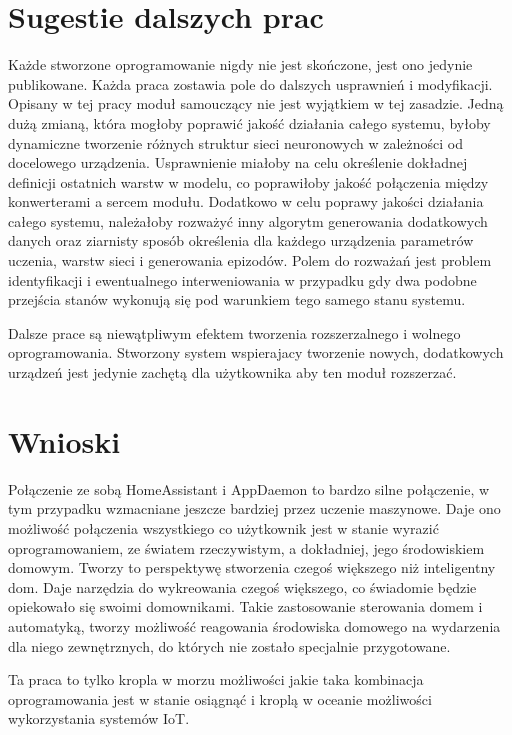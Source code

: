 \section*{Sugestie dalszych prac}
Każde stworzone oprogramowanie nigdy nie jest skończone, jest ono jedynie publikowane. Każda praca zostawia pole do dalszych usprawnień i modyfikacji. Opisany w tej pracy moduł samouczący nie jest wyjątkiem w tej zasadzie. Jedną dużą zmianą, która mogłoby poprawić jakość działania całego systemu, byłoby dynamiczne tworzenie różnych struktur sieci neuronowych w zależności od docelowego urządzenia. Usprawnienie miałoby na celu określenie dokładnej definicji ostatnich warstw w modelu, co poprawiłoby jakość połączenia między konwerterami a sercem modułu. Dodatkowo w celu poprawy jakości działania całego systemu, należałoby rozważyć inny algorytm generowania dodatkowych danych oraz ziarnisty sposób określenia dla każdego urządzenia parametrów uczenia, warstw sieci i generowania epizodów. Polem do rozważań jest problem identyfikacji i ewentualnego interweniowania w przypadku gdy dwa podobne przejścia stanów wykonują się pod warunkiem tego samego stanu systemu. 

Dalsze prace są niewątpliwym efektem tworzenia rozszerzalnego i wolnego oprogramowania. Stworzony system wspierajacy tworzenie nowych, dodatkowych urządzeń jest jedynie zachętą dla użytkownika aby ten moduł rozszerzać.

\section*{Wnioski}
Połączenie ze sobą HomeAssistant i AppDaemon to bardzo silne połączenie, w tym przypadku wzmacniane jeszcze bardziej przez uczenie maszynowe. Daje ono możliwość połączenia wszystkiego co użytkownik jest w stanie wyrazić oprogramowaniem, ze światem rzeczywistym, a dokładniej, jego środowiskiem domowym. Tworzy to perspektywę stworzenia czegoś większego niż inteligentny dom. Daje narzędzia do wykreowania czegoś większego, co świadomie będzie opiekowało się swoimi domownikami. Takie zastosowanie sterowania domem i automatyką, tworzy możliwość reagowania środowiska domowego na wydarzenia dla niego zewnętrznych, do których nie zostało specjalnie przygotowane. 

Ta praca to tylko kropla w morzu możliwości jakie taka kombinacja oprogramowania jest w stanie osiągnąć i kroplą w oceanie możliwości wykorzystania systemów IoT.
